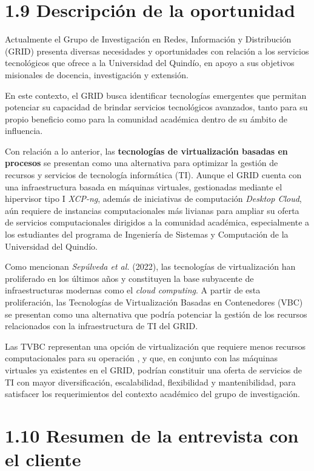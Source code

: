 \section*{1.9 Descripción de la oportunidad}

Actualmente el Grupo de Investigación en Redes, Información y Distribución (GRID) presenta diversas necesidades y oportunidades con relación a los servicios tecnológicos que ofrece a la Universidad del Quindío, en apoyo a sus objetivos misionales de docencia, investigación y extensión.

En este contexto, el GRID busca identificar tecnologías emergentes que permitan potenciar su capacidad de brindar servicios tecnológicos avanzados, tanto para su propio beneficio como para la comunidad académica dentro de su ámbito de influencia.

Con relación a lo anterior, las \textbf{tecnologías de virtualización basadas en procesos} se presentan como una alternativa para optimizar la gestión de recursos y servicios de tecnología informática (TI). Aunque el GRID cuenta con una infraestructura basada en máquinas virtuales, gestionadas mediante el hipervisor tipo I \textit{XCP-ng}, además de iniciativas de computación \textit{Desktop Cloud}, aún requiere de instancias computacionales más livianas para ampliar su oferta de servicios computacionales dirigidos a la comunidad académica, especialmente a los estudiantes del programa de Ingeniería de Sistemas y Computación de la Universidad del Quindío.

Como mencionan \textit{Sepúlveda et al.} (2022), las tecnologías de virtualización han proliferado en los últimos años y constituyen la base subyacente de infraestructuras modernas como el \textit{cloud computing}. A partir de esta proliferación, las Tecnologías de Virtualización Basadas en Contenedores (VBC) se presentan como una alternativa que podría potenciar la gestión de los recursos relacionados con la infraestructura de TI del GRID.

Las TVBC representan una opción de virtualización que requiere menos recursos computacionales para su operación \citep{Xavier2013}, y que, en conjunto con las máquinas virtuales ya existentes en el GRID, podrían constituir una oferta de servicios de TI con mayor diversificación, escalabilidad, flexibilidad y mantenibilidad, para satisfacer los requerimientos del contexto académico del grupo de investigación.

\section*{1.10 Resumen de la entrevista con el cliente}


